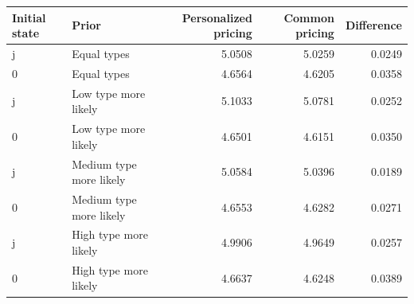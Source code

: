 \begin{tabular}{llrrr}\hline
Initial state & Prior & Personalized pricing & Common pricing & Difference\\\hline
j & Equal types & 5.0508 & 5.0259 & 0.0249 \\
0 & Equal types & 4.6564 & 4.6205 & 0.0358 \\
j & Low type more likely & 5.1033 & 5.0781 & 0.0252 \\
0 & Low type more likely & 4.6501 & 4.6151 & 0.0350 \\
j & Medium type more likely & 5.0584 & 5.0396 & 0.0189 \\
0 & Medium type more likely & 4.6553 & 4.6282 & 0.0271 \\
j & High type more likely & 4.9906 & 4.9649 & 0.0257 \\
0 & High type more likely & 4.6637 & 4.6248 & 0.0389 \\
\hline\end{tabular}
